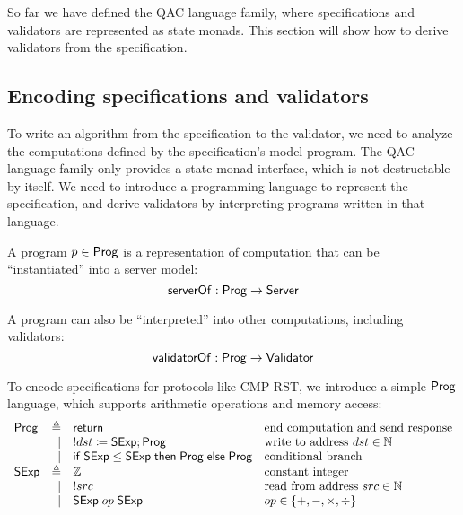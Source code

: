 So far we have defined the QAC language family, where specifications and
validators are represented as state monads.  This section will show how to
derive validators from the specification.

\subsection{Encoding specifications and validators}
\label{sec:proglang}
To write an algorithm from the specification to the validator, we need to
analyze the computations defined by the specification's model program.  The QAC
language family only provides a state monad interface, which is not destructable
by itself.  We need to introduce a programming language to represent the
specification, and derive validators by interpreting programs written in that
language.

\begin{definition}
  A program $p\in\mathsf{Prog}$ is a representation of computation that can be
  ``instantiated'' into a server model:
  \[\mathsf{serverOf}:\mathsf{Prog}\to\mathsf{Server}\]
  
  A program can also be ``interpreted'' into other computations, including
  validators:
  \[\mathsf{validatorOf}:\mathsf{Prog}\to\mathsf{Validator}\]
\end{definition}
To encode specifications for protocols like CMP-RST, we introduce a simple
$\mathsf{Prog}$ language, which supports arithmetic operations and memory access:
\[\begin{array}{lrll}
\Prog&\triangleq&\Return&\text{end computation and send response}\\
&\mid&!dst\coloneqq\Sexp;\Prog&\text{write to address }dst\in\Nat\\\null
&\mid&\If\Sexp\le\Sexp\Then\Prog\Else\Prog&\text{conditional branch}\\
\Sexp&\triangleq&\Int&\text{constant integer}\\
&\mid&!src&\text{read from address }src\in\Nat\\
&\mid&\Sexp\oop\Sexp&op\in\{+,-,\times,\div\}
\end{array}
\]

